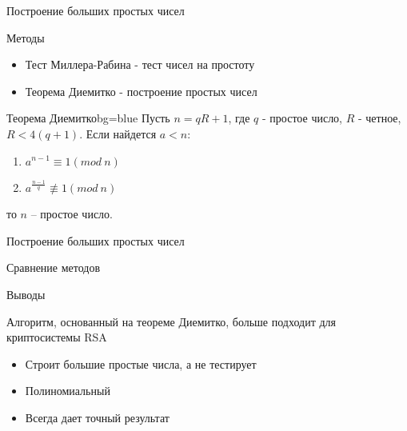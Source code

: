 
\begin{frame}{Построение больших простых чисел}
	\begin{block}{Методы}
		\begin{itemize}
			\item Тест Миллера-Рабина - тест чисел на простоту 
			\item Теорема Диемитко - построение простых чисел        
		\end{itemize}	
	\end{block}

	\begin{importantblock}{Теорема Диемитко}{}{bg=blue}
		Пусть {$n = q R + 1$}, где {$q$} - простое число, {$R$} - четное, {$R < 4(q + 1)$}. Если найдется {$a < n$}:
      
			\begin{enumerate}
			 \item {$a^{n - 1} \equiv 1(mod \: n)$}
			 \item {$a^{\frac{n - 1}{q}} \not\equiv 1(mod \: n)$}
			\end{enumerate}
			
      то {$n$} – простое число.
	\end{importantblock}
\end{frame}

\begin{frame}{Построение больших простых чисел}
		\begin{center}
			\begin{block}{Сравнение методов}
			\centering
		\end{block} \vspace{0.3cm}

		{\LARGE Выводы } \vspace{0.3cm}

		Алгоритм, основанный на теореме Диемитко, больше подходит для криптосистемы RSA

		\begin{itemize}
			\item Строит большие простые числа, а не тестирует
			\item Полиномиальный
			\item Всегда дает точный результат
		\end{itemize}
	\end{center}	
\end{frame}

